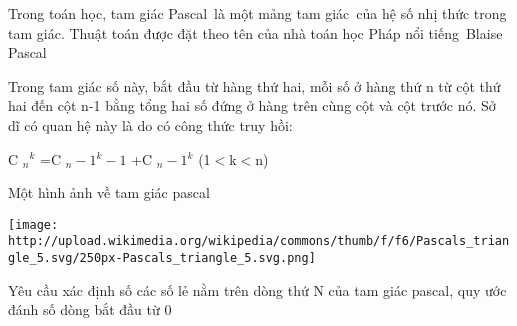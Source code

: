 Trong toán học, tam giác Pascal là một mảng tam giác của hệ số nhị thức trong tam giác. Thuật toán được đặt theo tên của nhà toán học Pháp nổi tiếng Blaise Pascal  

   Trong tam giác số này, bắt đầu từ hàng thứ hai, mỗi số ở hàng thứ n từ cột thứ hai đến cột n-1 bằng tổng hai số đứng ở hàng trên cùng cột và cột trước nó. Sở dĩ có quan hệ này là do có công thức truy hồi:  

   C   $_    n   $$^    k   $   =C   $_    n-1   $$^    k-1   $   +C   $_    n-1   $$^    k   $   (1$<$k$<$n)  

   Một hình ảnh về tam giác pascal  


\texttt{[image: http://upload.wikimedia.org/wikipedia/commons/thumb/f/f6/Pascals\_triangle\_5.svg/250px-Pascals\_triangle\_5.svg.png]}

   Yêu cầu xác định số các số lẻ nằm trên dòng thứ N của tam giác pascal, quy ước đánh số dòng bắt đầu từ 0